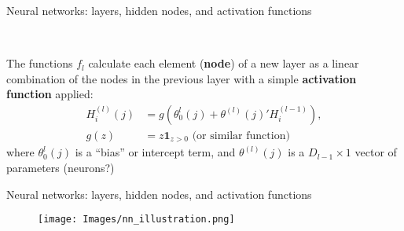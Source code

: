 \documentclass[xcolor=table, aspectratio=169]{beamer}
\newcommand{\alertbf}[1]{\alert{\textbf{#1}}}
\begin{document}
\begin{frame}[t]{Neural networks: layers, hidden nodes, and activation functions}
{{
}
}
{

~

The functions $f_l$ calculate each element (\alertbf{node}) of a new layer as a linear combination of the nodes in the previous layer with a simple \alertbf{activation function} applied:
\begin{align*}
    H_{i}^{(l)}(j) &= g\left( \theta_0^{l}(j) + \theta^{(l)}(j)' H_i^{(l-1)} \right), \\
    g(z) &= z \mathbf{1}_{z>0} \text{ (or similar function)}
\end{align*}
where $\theta_0^{l}(j)$ is a ``bias'' or intercept term, and $\theta^{(l)}(j)$ is a $D_{l-1} \times 1$ vector of parameters (neurons?)
}
    
\end{frame}

\begin{frame}{Neural networks: layers, hidden nodes, and activation functions}
    \begin{figure}
        \centering
        \texttt{[image: Images/nn\_illustration.png]}
    \end{figure}
\end{frame}
\end{document}
